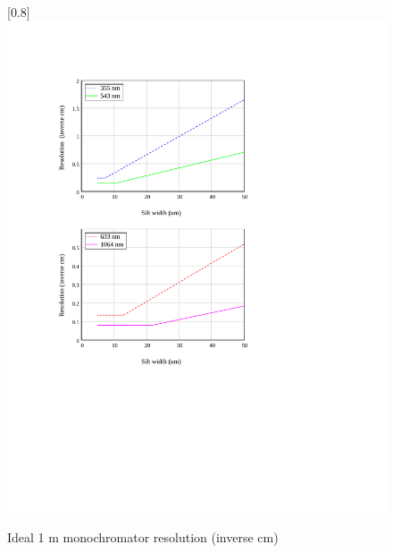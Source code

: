 \begin{figure}
\scalebox{0.8}[0.8]{
\includegraphics[bb=-30 245 489 600]
{near_cm/near_cm.pdf}
}
\caption{Ideal 1 m monochromator resolution (inverse cm)}
\label{near_cm}
\end{figure}

